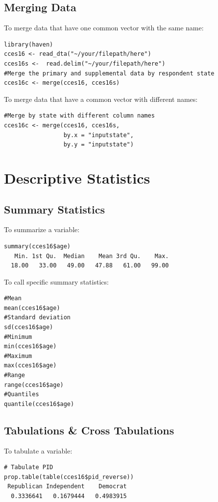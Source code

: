 \documentclass[12pt, letterpaper,notitlepage]{article}
\begin{document}
\subsection{Merging Data}
To merge data that have one common vector with the same name:


\begin{lstlisting}
library(haven)
cces16 <- read_dta("~/your/filepath/here")
cces16s <-  read.delim("~/your/filepath/here")
#Merge the primary and supplemental data by respondent state
cces16c <- merge(cces16, cces16s)
\end{lstlisting}

To merge data that have a common vector with different names:

\begin{lstlisting}
#Merge by state with different column names
cces16c <- merge(cces16, cces16s,
                 by.x = "inputstate", 
                 by.y = "inputstate")
\end{lstlisting}


\newpage

\section{Descriptive Statistics}
\subsection{Summary Statistics}
To summarize a variable:

\begin{lstlisting}
summary(cces16$age)
   Min. 1st Qu.  Median    Mean 3rd Qu.    Max. 
  18.00   33.00   49.00   47.88   61.00   99.00 
\end{lstlisting}


To call specific summary statistics:

\begin{lstlisting}
#Mean
mean(cces16$age)
#Standard deviation
sd(cces16$age)
#Minimum
min(cces16$age)
#Maximum
max(cces16$age)
#Range
range(cces16$age)
#Quantiles
quantile(cces16$age)
\end{lstlisting}

\subsection{Tabulations \& Cross Tabulations}

To tabulate a variable:
\begin{lstlisting}
# Tabulate PID
prop.table(table(cces16$pid_reverse))
 Republican Independent    Democrat 
  0.3336641   0.1679444   0.4983915 
\end{lstlisting}
\end{document}
